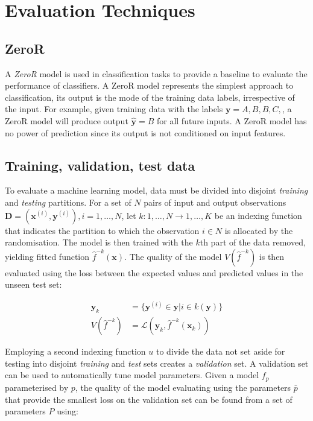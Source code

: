 \section{Evaluation Techniques}
\label{sec:evaluation-techniques}


\subsection{ZeroR}

A \emph{ZeroR} model is used in classification tasks to provide a baseline to evaluate the performance of classifiers. A ZeroR model represents the simplest approach to classification, its output is the mode of the training data labels, irrespective of the input. For example, given training data with the labels $\bm{y} = { A, B, B, C, }$, a ZeroR model will produce output $\bm{\hat{y}} = B$ for all future inputs. A ZeroR model has no power of prediction since its output is not conditioned on input features.


\subsection{Training, validation, test data}

To evaluate a machine learning model, data must be divided into disjoint \emph{training} and \emph{testing} partitions. For a set of $N$ pairs of input and output observations $\bm{D} = (\bm{x}^{(i)}, \bm{y}^{(i)}), i = 1, \ldots, N$, let $k : {1,\ldots,N} \rightarrow {1,\ldots,K}$ be an indexing function that indicates the partition to which the observation $i \in N$ is allocated by the randomisation. The model is then trained with the $k$th part of the data removed, yielding fitted function $\hat{f}^{-k}(\bm{x})$. The quality of the model $V(\hat{f}^{-k})$ is then evaluated using the loss between the expected values and predicted values in the unseen test set:

\begin{align}
  \bm{y}_k &= \{ \bm{y}^{(i)} \in \bm{y} | i \in k(\bm{y}) \} \\
  V(\hat{f}^{-k}) &= \mathcal{L}(\bm{y}_k, \hat{f}^{-k}(\bm{x}_k))
\end{align}

Employing a second indexing function $u$ to divide the data not set aside for testing into disjoint \emph{training} and \emph{test} sets creates a \emph{validation} set. A validation set can be used to automatically tune model parameters. Given a model $f_p$ parameterised by $p$, the quality of the model evaluating using the parameters $\bar{p}$ that provide the smallest loss on the validation set can be found from a set of parameters $P$ using:

